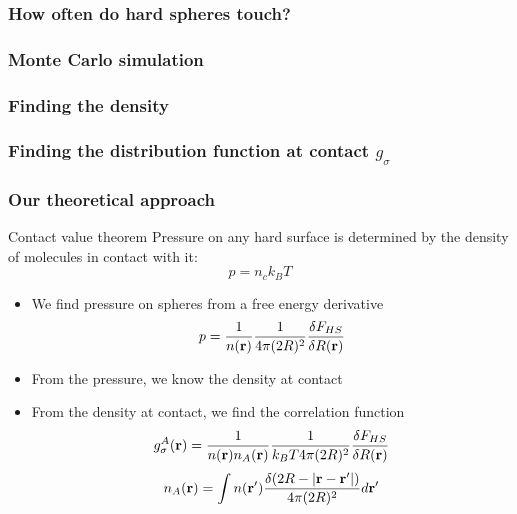 \begin{frame}
  \frametitle{How often do hard spheres touch?}
\end{frame}

\begin{frame}
  \frametitle{Monte Carlo simulation}
  \begin{figure}[h]
    \centering
  \end{figure}
\end{frame}

\begin{frame}
  \frametitle{Finding the density}
  \begin{figure}[h]
    \centering
  \end{figure}
\end{frame}

\begin{frame}
  \frametitle{Finding the distribution function at contact $g_\sigma$}
  \begin{figure}[h]
    \centering
  \end{figure}
\end{frame}

\begin{frame}
  \frametitle{Our theoretical approach}
  \begin{block}{Contact value theorem}
    Pressure on any hard surface is determined by the density of
    molecules in contact with it:
    \vspace{-1em}
    \[ p = n_{c}k_BT \]
    \vspace{-2em}
    \begin{itemize}
    \item We find pressure on spheres from a free energy derivative
      \vspace{-0.5em}
      \[p = \frac{1}{n(\mathbf{r})}\frac{1}{4\pi(2R)^2}\frac{\delta F_{HS}}{\delta R(\mathbf{r})}\]
    \item From the pressure, we know the density at contact
    \item From the density at contact, we find the correlation
      function
      \vspace{-0.5em}
      \[g_\sigma^A(\mathbf{r})
      = \frac{1}{n(\mathbf{r}) n_A(\mathbf{r})}\frac{1}{ k_BT 4\pi (2R)^2} \frac{\delta
        F_{HS}}{\delta R(\mathbf{r})}\]
      \[
      n_A(\mathbf{r}) = \int n(\mathbf{r}')
      \frac{\delta(2R -|\mathbf{r}-\mathbf{r}'|)}{4\pi(2R)^2} d\mathbf{r}' \label{eq:nA}
      \]
    \end{itemize}
  \end{block}
\end{frame}

